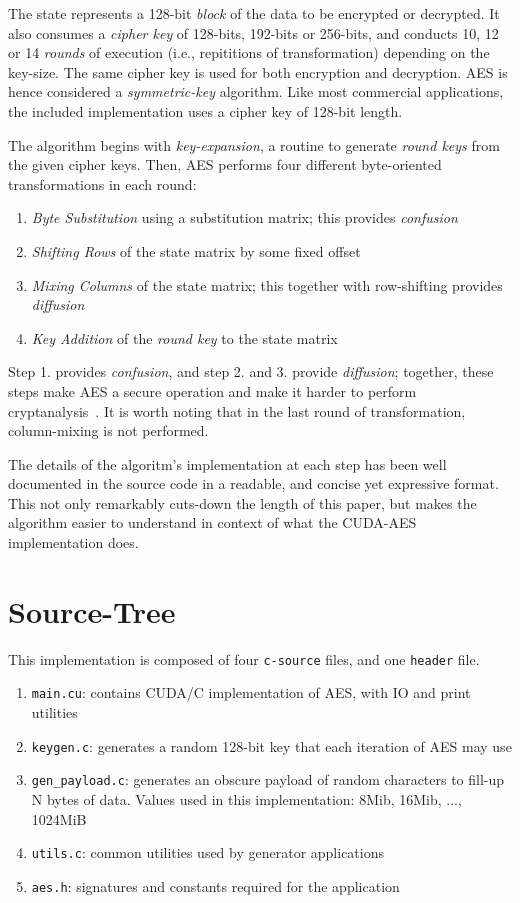 \documentclass[letterpaper,twocolumn,10pt]{article}
\begin{document}
The state represents a 128-bit \textit{block} of the data to be encrypted or decrypted.
It also consumes a \textit{cipher key} of {128-bits}, {192-bits} or {256-bits}, and conducts 10, 12 or 14 \textit{rounds} of execution (i.e., repititions of transformation) depending on the key-size.
The same cipher key is used for both encryption and decryption. AES is hence considered a \textit{symmetric-key} algorithm.
Like most commercial applications, the included implementation uses a cipher key of 128-bit length.

The algorithm begins with \textit{key-expansion}, a routine to generate \textit{round keys} from the given cipher keys.
Then, AES performs four different byte-oriented transformations in each round:
\begin{enumerate}
    \item \textit{Byte Substitution} using a substitution matrix; this provides \textit{confusion}~\cite{shanon}
    \item \textit{Shifting Rows} of the state matrix by some fixed offset
    \item \textit{Mixing Columns} of the state matrix; this together with row-shifting provides \textit{diffusion}~\cite{shanon}
    \item \textit{Key Addition} of the \textit{round key} to the state matrix
\end{enumerate}

Step 1. provides \textit{confusion}, and step 2. and 3. provide \textit{diffusion}; together, these steps make AES a secure operation and make it harder to perform cryptanalysis~\cite{shanon}.
It is worth noting that in the last round of transformation, column-mixing is not performed.

The details of the algoritm's implementation at each step has been well documented in the source code in a readable, and concise yet expressive format. This not only remarkably cuts-down the length of this paper, but makes the algorithm easier to understand in context of what the CUDA-AES implementation does.

\section{Source-Tree}
This implementation is composed of four \texttt{c-source} files, and one \texttt{header} file.
\begin{enumerate}
    \item \texttt{main.cu}: contains CUDA/C implementation of AES, with IO and print utilities
    \item \texttt{keygen.c}: generates a random 128-bit key that each iteration of AES may use
    \item \texttt{gen\_payload.c}: generates an obscure payload of random characters to fill-up N bytes of data. Values used in this implementation: 8Mib, 16Mib, $...$, 1024MiB
    \item \texttt{utils.c}: common utilities used by generator applications
    \item \texttt{aes.h}: signatures and constants required for the application
\end{enumerate}
\end{document}
